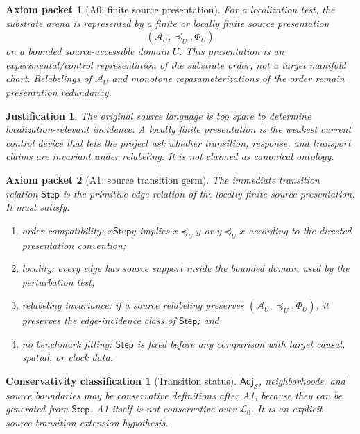\documentclass[11pt]{article}
\newcommand{\Sub}{\mathcal{A}}
\newcommand{\Step}{\mathsf{Step}}
\newcommand{\Adj}{\mathsf{Adj}_{\mathcal{S}}}
\newcommand{\Lang}{\mathcal{L}_{0}}
\newtheorem{axiompacket}{Axiom packet}
\newtheorem{justification}{Justification}
\newtheorem{classification}{Conservativity classification}
\begin{document}
\begin{axiompacket}[A0: finite source presentation]
For a localization test, the substrate arena is represented by a finite or
locally finite source presentation
\[
(\Sub_U,\preceq_U,\Phi_U)
\]
on a bounded source-accessible domain \(U\). This presentation is an
experimental/control representation of the substrate order, not a target
manifold chart. Relabelings of \(\Sub_U\) and monotone reparameterizations of
the order remain presentation redundancy.
\end{axiompacket}

\begin{justification}
The original source language is too spare to determine localization-relevant
incidence. A locally finite presentation is the weakest current control
device that lets the project ask whether transition, response, and transport
claims are invariant under relabeling. It is not claimed as canonical
ontology.
\end{justification}

\begin{axiompacket}[A1: source transition germ]
The immediate transition relation \(\Step\) is the primitive edge relation of
the locally finite source presentation. It must satisfy:
\begin{enumerate}
    \item order compatibility: \(x\Step y\) implies \(x\preceq_U y\) or
    \(y\preceq_U x\) according to the directed presentation convention;
    \item locality: every edge has source support inside the bounded domain
    used by the perturbation test;
    \item relabeling invariance: if a source relabeling preserves
    \((\Sub_U,\preceq_U,\Phi_U)\), it preserves the edge-incidence class of
    \(\Step\); and
    \item no benchmark fitting: \(\Step\) is fixed before any comparison with
    target causal, spatial, or clock data.
\end{enumerate}
\end{axiompacket}

\begin{classification}[Transition status]
\(\Adj\), neighborhoods, and source boundaries may be conservative
definitions after A1, because they can be generated from \(\Step\). A1 itself
is not conservative over \(\Lang\). It is an explicit source-transition
extension hypothesis.
\end{classification}
\end{document}

